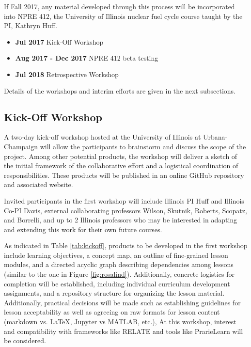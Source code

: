 \documentclass[11pt]{article}
\begin{document}
          If Fall 2017, any material developed through this process will be 
          incorporated into NPRE 412, the University of Illinois nuclear fuel 
          cycle course taught by the PI, Kathryn Huff.  

          \begin{itemize}
                  \item \textbf{Jul 2017} Kick-Off Workshop
                  \item \textbf{Aug 2017 - Dec 2017} NPRE 412 beta testing
                  \item \textbf{Jul 2018} Retrospective Workshop
          \end{itemize}

          Details of the workshops and interim efforts are given in the next 
          subsections.

          \subsection{Kick-Off Workshop}
          A two-day kick-off workshop hosted at the University of Illinois at 
          Urbana-Champaign will allow the 
          participants to brainstorm and discuss the scope of the project.
          Among other potential products, the workshop will deliver
          a sketch of the initial framework of the collaborative effort and
          a logistical coordination of responsibilities. These products will
          be published in an online GitHub repository 
          and associated website.

          Invited participants in the first workshop will include Illinois PI Huff 
          and Illinois Co-PI Davis, external collaborating professors Wilson, 
          Skutnik, Roberts, Scopatz, and Borrelli, and up to 2 Illinois professors 
          who may be interested in adapting and extending this work for their own 
          future courses.

          As indicated in Table \ref{tab:kickoff}, products to be developed in 
          the first workshop include learning 
          objectives\cite{bloom_bloom_1984}, a concept 
          map\cite{novak_concept_1990}, 
          an outline of fine-grained lesson modules, and a 
          directed acyclic graph describing dependencies among lessons (similar 
          to the one in Figure \ref{fig:rosalind}). Additionally, concrete logistics 
          for completion will be established, including individual curriculum 
          development assignments, and a repository structure for organizing 
          the lesson material. Additionally, practical decisions will be made 
          such as establishing guidelines for lesson acceptability as well as 
          agreeing on raw formats for lesson content (markdown vs. \LaTeX, 
          Jupyter vs MATLAB, etc.),  At this workshop, interest and 
          compatibility with frameworks like RELATE 
          \cite{kloeckner_relate_2017,kloeckner_relate_2017-1} and tools like 
          PrarieLearn \cite{west_prairielearn:_2015} will be considered.
\end{document}
